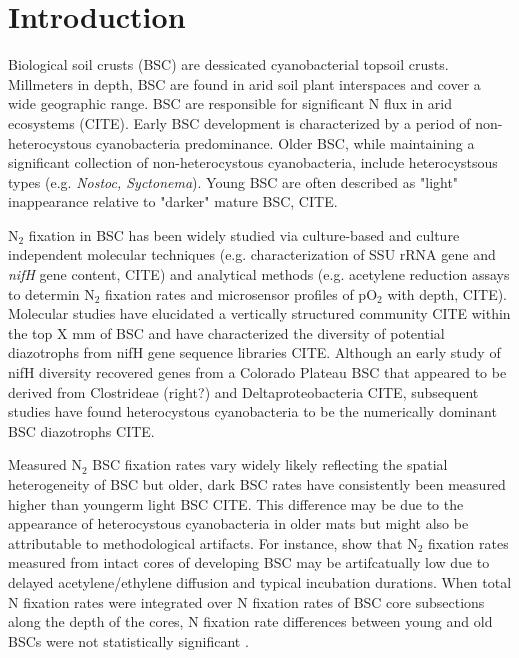 \section{Introduction}


Biological soil crusts (BSC) are dessicated cyanobacterial topsoil crusts. Millmeters in depth, BSC are found in arid soil plant interspaces and cover a wide geographic range. BSC are responsible for significant N flux in arid ecosystems (CITE). Early BSC development is characterized by a period of non-heterocystous cyanobacteria predominance. Older BSC, while maintaining a significant collection of non-heterocystous cyanobacteria, include heterocystsous types (e.g. \textit{Nostoc, Syctonema}). Young BSC are often described as "light" inappearance relative to "darker" mature BSC, CITE.

N$_{2}$ fixation in BSC has been widely studied via culture-based and culture independent molecular techniques (e.g. characterization of SSU rRNA gene and \textit{nifH} gene content, CITE) and analytical methods (e.g. acetylene reduction assays to determin N$_{2}$ fixation rates and microsensor profiles of pO$_{2}$ with depth, CITE). Molecular studies have elucidated a vertically structured community CITE within the top X mm of BSC and have characterized the diversity of potential diazotrophs from nifH gene sequence libraries CITE. Although an early study of nifH diversity recovered genes from a Colorado Plateau BSC that appeared to be derived from Clostrideae (right?) and Deltaproteobacteria CITE, subsequent studies have found heterocystous cyanobacteria to be the numerically dominant BSC diazotrophs CITE. 

Measured N$_{2}$ BSC fixation rates vary widely likely reflecting the spatial heterogeneity of BSC but older, dark BSC rates have consistently been measured higher than youngerm light BSC CITE. This difference may be due to the appearance of heterocystous cyanobacteria in older mats but might also be attributable to methodological artifacts. For instance, \citet{15643930} show that N$_{2}$ fixation rates measured from intact cores of developing BSC may be artifcatually low due to delayed acetylene/ethylene diffusion and typical incubation durations. When total N fixation rates were integrated over N fixation rates of BSC core subsections along the depth of the cores, N fixation rate differences between young and old BSCs were not statistically significant \cite{15643930}.

